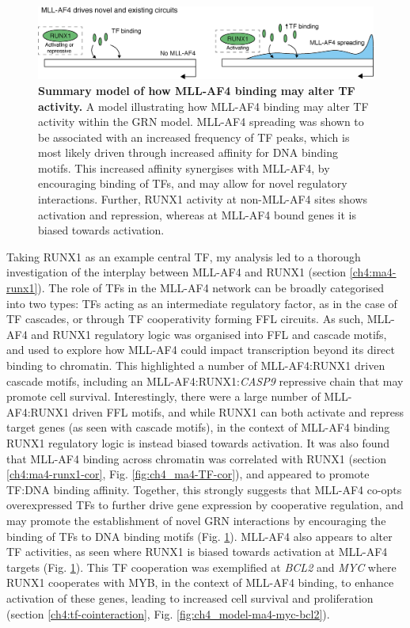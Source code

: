 \begin{figure}[!t]
    \centering
    \includegraphics[width=\textwidth,keepaspectratio]{figures/models/ch4_model-ma4-novel.png}
    \caption[{Summary model of how MLL-AF4 binding may alter TF activity.}]
    {\textbf{Summary model of how MLL-AF4 binding may alter TF activity.}
    A model illustrating how MLL-AF4 binding may alter TF activity within the GRN model. MLL-AF4 spreading was shown to be associated with an increased frequency of TF peaks, which is most likely driven through increased affinity for DNA binding motifs. This increased affinity synergises with MLL-AF4, by encouraging binding of TFs, and may allow for novel regulatory interactions. Further, RUNX1 activity at non-MLL-AF4 sites shows activation and repression, whereas at MLL-AF4 bound genes it is biased towards activation.
    }
    \label{fig:ch4_model-ma4-novel}
\end{figure}

Taking RUNX1 as an example central TF, my analysis led to a thorough investigation of the interplay between MLL-AF4 and RUNX1 (section \ref{ch4:ma4-runx1}). The role of TFs in the MLL-AF4 network can be broadly categorised into two types: TFs acting as an intermediate regulatory factor, as in the case of TF cascades, or through TF cooperativity forming FFL circuits. As such, MLL-AF4 and RUNX1 regulatory logic was organised into FFL and cascade motifs, and used to explore how MLL-AF4 could impact transcription beyond its direct binding to chromatin. This highlighted a number of MLL-AF4:RUNX1 driven cascade motifs, including an MLL-AF4:RUNX1:\textit{CASP9} repressive chain that may promote cell survival. Interestingly, there were a large number of MLL-AF4:RUNX1 driven FFL motifs, and while RUNX1 can both activate and repress target genes (as seen with cascade motifs), in the context of MLL-AF4 binding RUNX1 regulatory logic is instead biased towards activation. It was also found that MLL-AF4 binding across chromatin was correlated with RUNX1 (section \ref{ch4:ma4-runx1-cor}, Fig. \ref{fig:ch4_ma4-TF-cor}), and appeared to promote TF:DNA binding affinity. Together, this strongly suggests that MLL-AF4 co-opts overexpressed TFs to further drive gene expression by cooperative regulation, and may promote the establishment of novel GRN interactions by encouraging the binding of TFs to DNA binding motifs (Fig. \ref{fig:ch4_model-ma4-novel}). MLL-AF4 also appears to alter TF activities, as seen where RUNX1 is biased towards activation at MLL-AF4 targets (Fig. \ref{fig:ch4_model-ma4-novel}). This TF cooperation was exemplified at \textit{BCL2} and \textit{MYC} where RUNX1 cooperates with MYB, in the context of MLL-AF4 binding, to enhance activation of these genes, leading to increased cell survival and proliferation (section \ref{ch4:tf-cointeraction}, Fig. \ref{fig:ch4_model-ma4-myc-bcl2}). 

